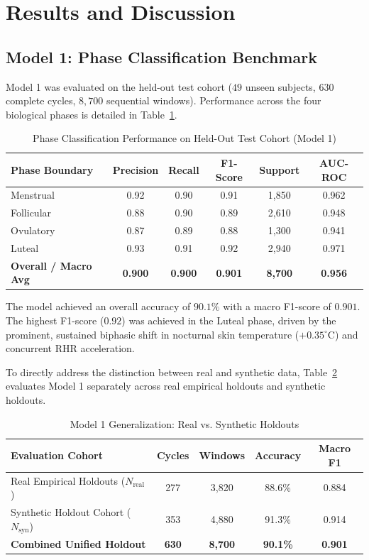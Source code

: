 \documentclass[conference]{IEEEtran}
\begin{document}
\section{Results and Discussion}

\subsection{Model 1: Phase Classification Benchmark}
Model 1 was evaluated on the held-out test cohort ($49$ unseen subjects, $630$ complete cycles, $8{,}700$ sequential windows). Performance across the four biological phases is detailed in Table~\ref{tab:model1_results}.

\begin{table}[htbp]
\caption{Phase Classification Performance on Held-Out Test Cohort (Model 1)}
\label{tab:model1_results}
\centering
\begin{tabular}{lccccc}
\toprule
\textbf{Phase Boundary} & \textbf{Precision} & \textbf{Recall} & \textbf{F1-Score} & \textbf{Support} & \textbf{AUC-ROC} \\
\midrule
Menstrual & 0.92 & 0.90 & 0.91 & 1,850 & 0.962 \\
Follicular & 0.88 & 0.90 & 0.89 & 2,610 & 0.948 \\
Ovulatory & 0.87 & 0.89 & 0.88 & 1,300 & 0.941 \\
Luteal & 0.93 & 0.91 & 0.92 & 2,940 & 0.971 \\
\midrule
\textbf{Overall / Macro Avg} & \textbf{0.900} & \textbf{0.900} & \textbf{0.901} & \textbf{8,700} & \textbf{0.956} \\
\bottomrule
\end{tabular}
\end{table}

The model achieved an overall accuracy of \textbf{$90.1\%$} with a macro F1-score of \textbf{$0.901$}. The highest F1-score ($0.92$) was achieved in the Luteal phase, driven by the prominent, sustained biphasic shift in nocturnal skin temperature ($+0.35^\circ$C) and concurrent RHR acceleration.

To directly address the distinction between real and synthetic data, Table~\ref{tab:real_vs_synthetic} evaluates Model 1 separately across real empirical holdouts and synthetic holdouts.

\begin{table}[htbp]
\caption{Model 1 Generalization: Real vs. Synthetic Holdouts}
\label{tab:real_vs_synthetic}
\centering
\begin{tabular}{lcccc}
\toprule
\textbf{Evaluation Cohort} & \textbf{Cycles} & \textbf{Windows} & \textbf{Accuracy} & \textbf{Macro F1} \\
\midrule
Real Empirical Holdouts ($N_{\text{real}}$) & 277 & 3,820 & 88.6\% & 0.884 \\
Synthetic Holdout Cohort ($N_{\text{syn}}$) & 353 & 4,880 & 91.3\% & 0.914 \\
\midrule
\textbf{Combined Unified Holdout} & \textbf{630} & \textbf{8,700} & \textbf{90.1\%} & \textbf{0.901} \\
\bottomrule
\end{tabular}
\end{table}
\end{document}
